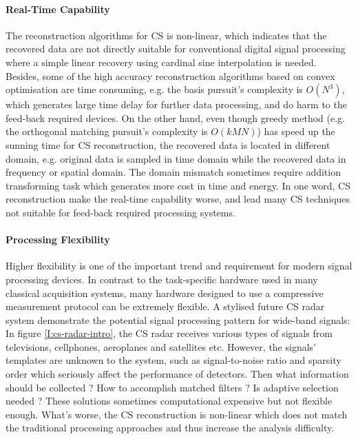 \paragraph{Real-Time Capability}
The reconstruction algorithms for CS is non-linear, which indicates that the recovered data are not directly suitable for conventional digital signal processing where a simple linear recovery using cardinal sine interpolation is needed. Besides, some of the high accuracy reconstruction algorithms based on convex optimisation are time consuming, e.g. the basis pursuit's complexity is $O(N^3)$, which generates large time delay for further data processing, and do harm to the feed-back required devices. On the other hand, even though greedy method (e.g. the orthogonal matching pursuit's complexity is $O(kMN)$) has speed up the sunning time for CS reconstruction, the recovered data is located in different domain, e.g. original data is sampled in time domain while the recovered data in frequency or spatial domain. The domain mismatch sometimes require addition transforming task which generates more cost in time and energy. In one word, CS reconstruction make the real-time capability worse, and lead many CS techniques not suitable for feed-back required processing systems.  

\paragraph{Processing Flexibility}
Higher flexibility is one of the important trend and requirement for modern signal processing devices. In contrast to the task-specific hardware used in many classical acquisition systems, many hardware designed to use a compressive measurement protocol can be extremely flexible. 
A stylised future CS radar system demonstrate the potential signal processing pattern for wide-band signals:  In figure \ref{I:cs-radar-intro}, the CS radar receives various types of signals from televisions, cellphones, aeroplanes and satellites etc. However, the signals' templates are unknown to the system, such as signal-to-noise ratio and sparsity order which seriously affect the performance of detectors. Then what information should be collected ? How to accomplish matched filters ? Is adaptive selection needed ? These solutions sometimes computational expensive but not flexible enough. What's worse, the CS reconstruction is non-linear which does not match the traditional processing approaches and thus increase the analysis difficulty. 

